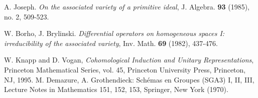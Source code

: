 \documentclass[12pt]{amsart}
\numberwithin{equation}{section}
\begin{document}
\begin{thebibliography}{99}


      A. Joseph. \textit{On the associated variety of a primitive ideal}, J. Algebra. \textbf{93} (1985), no. 2, 509-523.


      W. Borho, J. Brylinski. \textit{Differential operators on homogeneous spaces I: irreducibility of the associated variety}, Inv. Math. \textbf{69} (1982), 437-476.

      W. Knapp and D. Vogan, \textit{Cohomological Induction and Unitary Representations}, Princeton Mathematical Series, vol. 45, Princeton University Press, Princeton, NJ, 1995.
      M. Demazure, A. Grothendieck: Schémas en Groupes (SGA3) I, II, III, Lecture Notes in Mathematics 151, 152, 153, Springer, New York (1970). 


\end{thebibliography}
\end{document}
